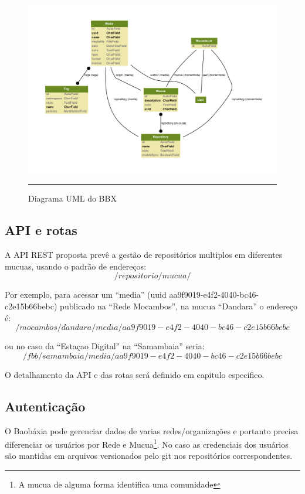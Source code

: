 \begin{figure}[htbp]
  \centering
  \includegraphics[width=\textwidth]{./Fig/Auto_UML_Diagram.pdf}
  \rule{35em}{0.5pt}
  \caption[Diagrama UML do BBX]{Diagrama UML do BBX}
  \label{fig:SchemaServer_ReteMocambos}
\end{figure}

\subsection{API e rotas}
A API REST proposta prevê a gestão de repositórios multiplos em
diferentes mucuas, usando o padrão de endereços:
$$ /repositorio/mucua/ $$ 

Por exemplo, para acessar um ``media'' (uuid
aa9f9019-e4f2-4040-bc46-c2e15b66bebc) publicado na ``Rede Mocambos'', na
mucua ``Dandara'' o endereço é:
$$ /mocambos/dandara/media/aa9f9019-e4f2-4040-bc46-c2e15b66bebc $$

ou no caso da ``Estaçao Digital'' na ``Samambaia'' seria:
$$ /fbb/samambaia/media/aa9f9019-e4f2-4040-bc46-c2e15b66bebc $$

O detalhamento da API e das rotas será definido em capitulo especifico. %

\subsection{Autenticação}
O Baobáxia pode gerenciar dados de varias redes/organizações e
portanto precisa diferenciar os usuários por Rede e Mucua\footnote{A
  mucua de alguma forma identifica uma comunidade}. No caso as
credenciais dos usuários são mantidas em arquivos versionados pelo git
nos repositórios correspondentes.

